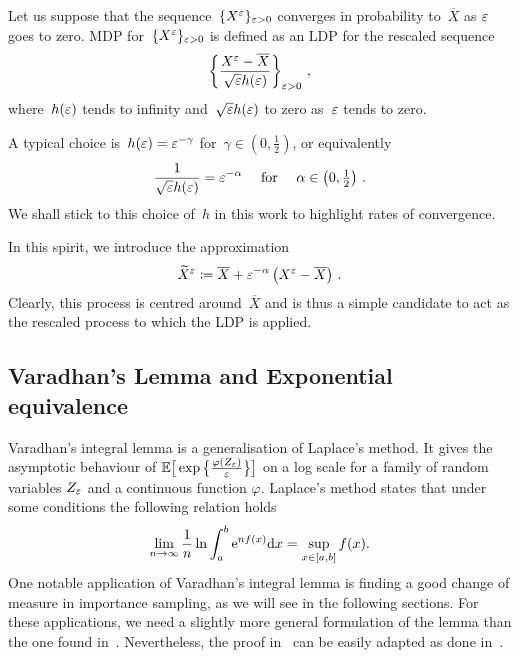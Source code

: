 \begin{definition}
Let us suppose that the sequence~$\{X^{\varepsilon}\}_{\varepsilon>0}$ converges in probability to~$\overline{X}$ as $\varepsilon$ goes to zero. MDP for~$\{X^{\varepsilon}\}_{\varepsilon>0}$ is defined as an LDP for the rescaled sequence 
$$
\left\{\frac{X^{\varepsilon} - \overline{X}}{\sqrt{\varepsilon}h(\varepsilon)}
\right\}_{\varepsilon>0}\,,
$$
where~$h(\varepsilon)$ tends to infinity and~$\sqrt{\varepsilon}h(\varepsilon)$ to zero as~$\varepsilon$ tends to zero. 
\end{definition}
\begin{remark}
   A typical choice is~$h(\varepsilon) = \varepsilon^{-\gamma}$ for~$\gamma \in (0,\frac{1}{2})$, or equivalently
   $$\frac{1}{\sqrt{\varepsilon}h(\varepsilon)} = \varepsilon^{-\alpha} \quad \text{ for } \quad \alpha\in\left(0,\tfrac{1}{2}\right)\,.$$
   We shall stick to this choice of~$h$ in this work to highlight rates of convergence. 
\end{remark}

In this spirit, we introduce the approximation
\begin{equation}\label{eq:MDPSmallNoiseGeneral}
\widetilde{X}^{\varepsilon} \coloneqq \overline{X} + 
\varepsilon^{-\alpha}\left(X^{\varepsilon} - \overline{X}\right)\,.
\end{equation}
Clearly, this process is centred around~$\overline{X}$ and is thus a simple candidate to act as the rescaled process to which the LDP is applied. 


\subsection{Varadhan's Lemma and Exponential equivalence}\label{sec:varadhan}

Varadhan's integral lemma is a generalisation of Laplace's method. It gives the asymptotic behaviour of $\mathbb{E}\big[\exp\big\{\frac{\varphi(Z_{\varepsilon})}{\varepsilon}\big\}\big]$ on a log scale for a family of random variables $Z_{\varepsilon}$ and a continuous function $\varphi$. Laplace's method states that under some conditions the following relation holds
$$\lim_{n\rightarrow\infty}\frac{1}{n}\ln \int_a^b \mathrm{e}^{n f(x)} \mathrm{d} x = \sup\limits_{x\in[a,b]}f(x).$$
One notable application of Varadhan's integral lemma is finding a good change of measure in importance sampling, as we will see in the following sections. For these applications, we need a slightly more general formulation of the lemma than the one found in~\cite[Theorem~4.3.1]{Dembo2010LargeApplications}. Nevertheless, the proof in~\cite[Theorem~4.3.1]{Dembo2010LargeApplications} can be easily adapted as done in~\cite[Lemma~4.4.]{Robertson2010SampleModels}.

